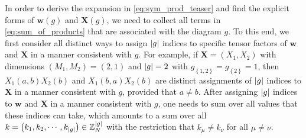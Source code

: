 \documentclass[nofootinbib,notitlepage,11pt]{revtex4-2}
\newcommand{\p}[1]{\left(#1\right)} %
\renewcommand{\set}[1]{\left\{#1\right\}} %
\newcommand{\m}{\bm} %
\newcommand{\1}{\mathds{1}}
\newcommand{\ZZ}{\mathbb{Z}}
\begin{document}
In order to derive the expansion in \eqref{eq:sym_prod_teaser} and
find the explicit forms of $\m w\p{g}$ and $\m X\p{g}$, we need to
collect all terms in \eqref{eq:sum_of_products} that are associated
with the diagram $g$.  To this end, we first consider all distinct
ways to assign $\abs{g}$ indices to specific tensor factors of $\m w$
and $\m X$ in a manner consistent with $g$.  For example, if
$\m X=\p{X_1,X_2}$ with dimensions $\p{M_1,M_2}=\p{2,1}$ and
$\abs{g}=2$ with $g_{\set{1,2}}=g_{\set{2}}=1$, then
$X_1\p{a,b} X_2\p{b}$ and $X_1\p{b,a} X_2\p{b}$ are distinct
assignments of $\abs{g}$ indices to $\m X$ in a manner consistent with
$g$, provided that $a\ne b$.  After assigning $\abs{g}$ indices to
$\m w$ and $\m X$ in a manner consistent with $g$, one needs to sum
over all values that these indices can take, which amounts to a sum
over all $k=\p{k_1,k_2,\cdots,k_{\abs{g}}}\in\ZZ_N^{\abs{g}}$ with the
restriction that $k_\mu\ne k_\nu$ for all $\mu\ne\nu$.
\end{document}
